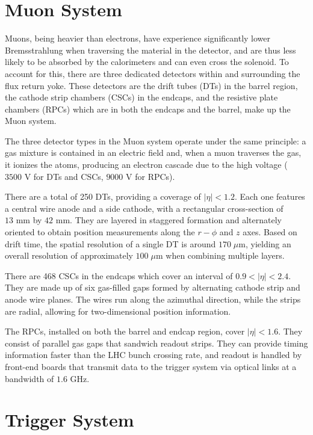 \section{Muon System}
\label{sec:muon}

Muons, being heavier than electrons, have experience significantly lower Bremsstrahlung when traversing the material in the detector, and are thus less likely to be absorbed by the calorimeters and can even cross the solenoid. To account for this, there are three dedicated detectors within and surrounding the flux return yoke. These detectors are the drift tubes (DTs) in the barrel region, the cathode strip chambers (CSCs) in the endcaps, and the resistive plate chambers (RPCs) which are in both the endcaps and the barrel, make up the Muon system.

The three detector types in the Muon system operate under the same principle: a gas mixture is contained in an electric field and, when a muon traverses the gas, it ionizes the atoms, producing an electron cascade due to the high voltage ($3500 \text{ V}$ for DTs and CSCs, $9000 \text{ V}$ for RPCs).

There are a total of 250 DTs, providing a coverage of $|\eta| <1.2$. Each one features a central wire anode and a side cathode, with a rectangular cross-section of $13 \text{ mm}$ by $42 \text{ mm}$. They are layered in staggered formation and alternately oriented to obtain position measurements along the $r-\phi$ and $z$ axes. Based on drift time, the spatial resolution of a single DT is around $170 \;\mu\text{m}$, yielding an overall resolution of approximately $100 \;\mu\text{m}$ when combining multiple layers.

There are 468 CSCs in the endcaps which cover an interval of $0.9 <|\eta|< 2.4$. They are made up of six gas-filled gaps formed by alternating cathode strip and anode wire planes. The wires run along the azimuthal direction, while the strips are radial, allowing for two-dimensional position information.

The RPCs, installed on both the barrel and endcap region, cover $|\eta| <1.6$. They consist of parallel gas gaps that sandwich readout strips. They can provide timing information faster than the LHC bunch crossing rate, and readout is handled by front-end boards that transmit data to the trigger system via optical links at a bandwidth of $1.6\text{ GHz}$.

\section{Trigger System}
\label{sec:triggers}

